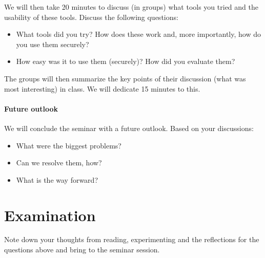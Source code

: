 We will then take 20 minutes to discuss (in groups) what tools you tried and 
the usability of these tools.
Discuss the following questions:
\begin{itemize}
  \item What tools did you try?
    How does these work and, more importantly, how do you use them securely?

  \item How easy was it to use them (securely)?
    How did you evaluate them?
\end{itemize}

The groups will then summarize the key points of their discussion (\eg what was 
most interesting) in class.
We will dedicate 15 minutes to this.

\paragraph{Future outlook}

We will conclude the seminar with a future outlook.
Based on your discussions:
\begin{itemize}
  \item What were the biggest problems?
  \item Can we resolve them, how?
  \item What is the way forward?
\end{itemize}


\section{Examination}

Note down your thoughts from reading, experimenting and the reflections for the 
questions above and bring to the seminar session.


\printbibliography
